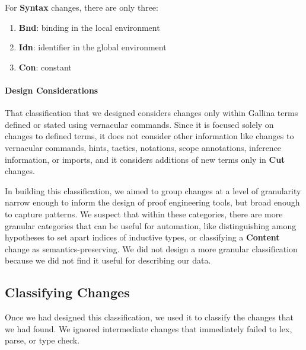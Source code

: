 For \textbf{Syntax} changes, there are only three:

\begin{enumerate}
\item \textbf{Bnd}: binding in the local environment
\item \textbf{Idn}: identifier in the global environment
\item \textbf{Con}: constant
\end{enumerate}

\paragraph{Design Considerations}

That classification that we designed considers changes only within
Gallina terms defined or stated using vernacular commands.
Since it is focused solely on changes to defined terms,
it does not consider other information like changes to vernacular commands,
hints, tactics, notations, scope annotations, inference information, or imports,
and it considers additions of new terms only in \textbf{Cut} changes.

In building this classification, we aimed to group
changes at a level of granularity narrow enough to inform the design of proof
engineering tools, but broad enough to capture patterns.
We suspect that within these categories, there are more granular
categories that can be useful for automation, like distinguishing among
hypotheses to set apart indices of inductive types, or classifying
a \textbf{Content} change as semantics-preserving.
We did not design a more granular classification because we did not
find it useful for describing our data.

\subsection{Classifying Changes}
\label{sec:changes}

Once we had designed this classification,
we used it to classify the changes that we had found.
We ignored intermediate changes that immediately failed to lex, parse, or type check.

